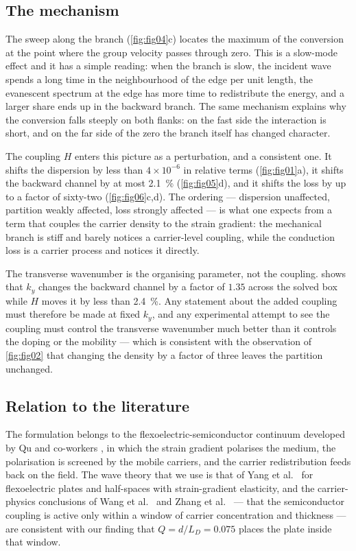 \subsection{The mechanism}
\label{sec:disc_mechanism}

The sweep along the branch (\cref{fig:fig04}c) locates the maximum of the
conversion at the point where the group velocity passes through zero.  This is a
slow-mode effect and it has a simple reading: when the branch is slow, the
incident wave spends a long time in the neighbourhood of the edge per unit
length, the evanescent spectrum at the edge has more time to redistribute the
energy, and a larger share ends up in the backward branch.  The same mechanism
explains why the conversion falls steeply on both flanks: on the fast side the
interaction is short, and on the far side of the zero the branch itself has
changed character.

The coupling $H$ enters this picture as a perturbation, and a consistent one.
It shifts the dispersion by less than $4\times10^{-6}$ in relative terms
(\cref{fig:fig01}a), it shifts the backward channel by at most
\SI{2.1}{\percent} (\cref{fig:fig05}d), and it shifts the loss by up to a factor
of sixty-two (\cref{fig:fig06}c,d).  The ordering --- dispersion unaffected,
partition weakly affected, loss strongly affected --- is what one expects from a
term that couples the carrier density to the strain gradient: the mechanical
branch is stiff and barely notices a carrier-level coupling, while the
conduction loss is a carrier process and notices it directly.

The transverse wavenumber is the organising parameter, not the coupling.
 shows that $k_y$ changes the backward channel by a factor of
$1.35$ across the solved box while $H$ moves it by less than \SI{2.4}{\percent}.
Any statement about the added coupling must therefore be made at fixed $k_y$,
and any experimental attempt to see the coupling must control the transverse
wavenumber much better than it controls the doping or the mobility --- which is
consistent with the observation of \cref{fig:fig02} that changing the density by
a factor of three leaves the partition unchanged.

\subsection{Relation to the literature}
\label{sec:disc_literature}

The formulation belongs to the flexoelectric-semiconductor continuum developed
by Qu and co-workers \cite{qu2020mobile,qu2022thermal}, in which the strain
gradient polarises the medium, the polarisation is screened by the mobile
carriers, and the carrier redistribution feeds back on the field.  The wave
theory that we use is that of Yang et al.\ \cite{yang2018lamb,yang2020rayleigh}
for flexoelectric plates and half-spaces with strain-gradient elasticity, and the
carrier-physics conclusions of Wang et al.\ \cite{wang2025rayleigh} and Zhang et
al.\ \cite{zhang2025pscplate} --- that the semiconductor coupling is active only
within a window of carrier concentration and thickness --- are consistent with
our finding that $Q=d/L_D=0.075$ places the plate inside that window.

